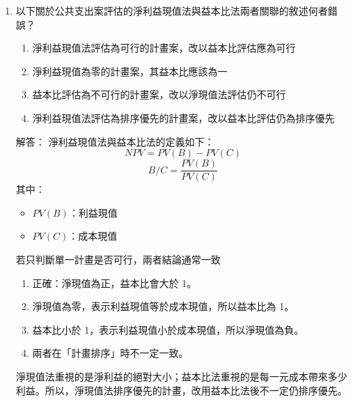\documentclass[12pt, a4paper]{article}
\begin{document}
\begin{enumerate}
    \item 以下關於公共支出案評估的淨利益現值法與益本比法兩者關聯的敘述何者錯誤？
    \begin{enumerate}[label=\Alph*.]
        \item 淨利益現值法評估為可行的計畫案，改以益本比評估應為可行
        \item 淨利益現值為零的計畫案，其益本比應該為一
        \item 益本比評估為不可行的計畫案，改以淨現值法評估仍不可行
        \item 淨利益現值法評估為排序優先的計畫案，改以益本比評估仍為排序優先
    \end{enumerate}
    解答：
    淨利益現值法與益本比法的定義如下：
    \[
    NPV = PV(B) - PV(C)
    \]
    \[
    B/C = \frac{PV(B)}{PV(C)}
    \]
    其中：
    \begin{itemize}
        \item \(PV(B)\)：利益現值
        \item \(PV(C)\)：成本現值
    \end{itemize}
    若只判斷單一計畫是否可行，兩者結論通常一致
    \begin{enumerate}[label=\Alph*.]
        \item 正確：淨現值為正，益本比會大於 1。
        \item 淨現值為零，表示利益現值等於成本現值，所以益本比為 1。
        \item 益本比小於 1，表示利益現值小於成本現值，所以淨現值為負。
        \item 兩者在「計畫排序」時不一定一致。
    \end{enumerate}
    淨現值法重視的是淨利益的絕對大小；益本比法重視的是每一元成本帶來多少利益。所以，淨現值法排序優先的計畫，改用益本比法後不一定仍排序優先。


\end{enumerate}
\end{document}
